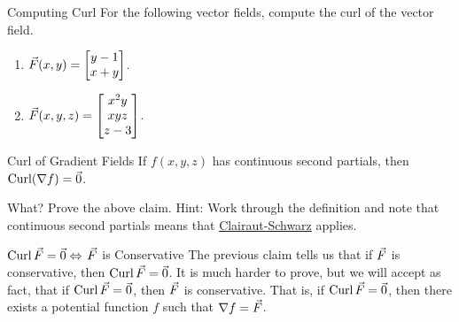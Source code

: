 \begin{exercise}{Computing Curl}
For the following vector fields, compute the curl of the vector field.
\vspace{1em}
\begin{enumerate}
\item $\vec{F}(x,y)=\begin{bmatrix}y-1\\x+y\end{bmatrix}$.
\vspace{1em}
\item $\vec{F}(x,y,z)=\begin{bmatrix}x^2y\\xyz\\z-3\end{bmatrix}$.
\end{enumerate}
\end{exercise}

\begin{claim}{Curl of Gradient Fields}
If $f(x,y,z)$ has continuous second partials, then $\operatorname{Curl}(\nabla f)=\vec{0}$.
\end{claim}

\begin{exercise}{What?}
Prove the above claim. Hint: Work through the definition and note that continuous second partials means that \hyperlink{cs}{Clairaut-Schwarz} applies.
\end{exercise}

\begin{claim}{$\operatorname{Curl}\vec{F}=\vec{0} \Leftrightarrow$ $\vec{F}$ is Conservative}
The previous claim tells us that if $\vec{F}$ is conservative, then $\operatorname{Curl}\vec{F}=\vec{0}$. It is much harder to prove, but we will accept as fact, that if $\operatorname{Curl}\vec{F}=\vec{0}$, then $\vec{F}$ is conservative. That is, if $\operatorname{Curl}\vec{F}=\vec{0}$, then there exists a potential function $f$ such that $\nabla f=\vec{F}$. 
\end{claim}

